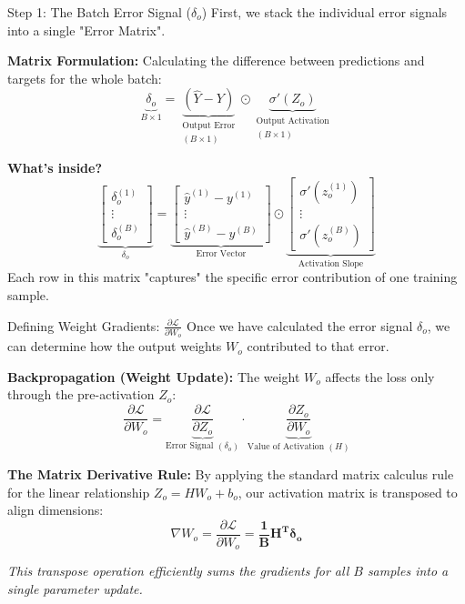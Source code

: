 \documentclass[5pt,aspectratio=169]{beamer}
\begin{document}
\begin{frame}{Step 1: The Batch Error Signal ($\delta_o$)}
First, we stack the individual error signals into a single "Error Matrix".

\textbf{Matrix Formulation:}
Calculating the difference between predictions and targets for the whole batch:
\[ \underbrace{\delta_o}_{B \times 1} = \underbrace{(\hat{Y} - Y)}_{\substack{\text{Output Error} \\ (B \times 1)}} \odot \underbrace{\sigma'(Z_o)}_{\substack{\text{Output Activation} \\ (B \times 1)}} \]

\textbf{What's inside?}
\[ \underbrace{\begin{bmatrix} \delta_o^{(1)} \\ \vdots \\ \delta_o^{(B)} \end{bmatrix}}_{\delta_o} = \underbrace{\begin{bmatrix} \hat{y}^{(1)} - y^{(1)} \\ \vdots \\ \hat{y}^{(B)} - y^{(B)} \end{bmatrix}}_{\text{Error Vector}} \odot \underbrace{\begin{bmatrix} \sigma'(z_o^{(1)}) \\ \vdots \\ \sigma'(z_o^{(B)}) \end{bmatrix}}_{\text{Activation Slope}} \]
Each row in this matrix "captures" the specific error contribution of one training sample.
\end{frame}

\begin{frame}{Defining Weight Gradients: $\frac{\partial \mathcal{L}}{\partial W_o}$}
Once we have calculated the error signal $\delta_o$, we can determine how the output weights $W_o$ contributed to that error.

\textbf{Backpropagation (Weight Update):}
The weight $W_o$ affects the loss only through the pre-activation $Z_o$:
\[ 
\frac{\partial \mathcal{L}}{\partial W_o} = \underbrace{\frac{\partial \mathcal{L}}{\partial Z_o}}_{\text{Error Signal } (\delta_o)} \cdot \underbrace{\frac{\partial Z_o}{\partial W_o}}_{\text{Value of Activation } (H)} 
\]

\textbf{The Matrix Derivative Rule:}
By applying the standard matrix calculus rule for the linear relationship $Z_o = H W_o + b_o$, our activation matrix is transposed to align dimensions:
\[ 
\nabla W_o = \frac{\partial \mathcal{L}}{\partial W_o} = \mathbf{\frac{1}{B} H^T \delta_o}
\]

\vfill
\centering
\textit{This transpose operation efficiently sums the gradients for all $B$ samples into a single parameter update.}
\end{frame}
\end{document}
